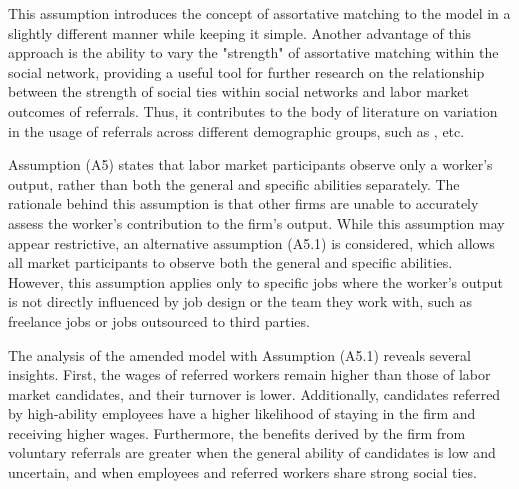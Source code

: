 \documentclass[12pt]{article}
\begin{document}
This assumption introduces the concept of assortative matching to the model in a slightly different manner while keeping it simple. Another advantage of this approach is the ability to vary the "strength" of assortative matching within the social network, providing a useful tool for further research on the relationship between the strength of social ties within social networks and labor market outcomes of referrals. Thus, it contributes to the body of literature on variation in the usage of referrals across different demographic groups, such as \cite{montgomery1994weak, granovetter1995getting, calvo2004effects, kuzubas2009endogenous, lester2021heterogeneous}, etc.

Assumption (A5) states that labor market participants observe only a worker's output, rather than both the general and specific abilities separately. The rationale behind this assumption is that other firms are unable to accurately assess the worker's contribution to the firm's output. While this assumption may appear restrictive, an alternative assumption (A5.1) is considered, which allows all market participants to observe both the general and specific abilities. However, this assumption applies only to specific jobs where the worker's output is not directly influenced by job design or the team they work with, such as freelance jobs or jobs outsourced to third parties.

The analysis of the amended model with Assumption (A5.1) reveals several insights. First, the wages of referred workers remain higher than those of labor market candidates, and their turnover is lower. Additionally, candidates referred by high-ability employees have a higher likelihood of staying in the firm and receiving higher wages. Furthermore, the benefits derived by the firm from voluntary referrals are greater when the general ability of candidates is low and uncertain, and when employees and referred workers share strong social ties.
\end{document}

